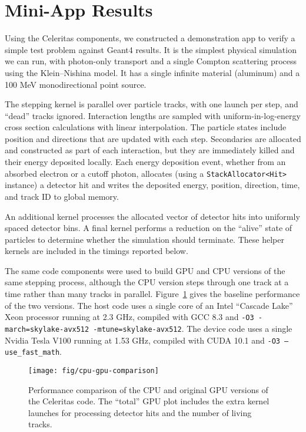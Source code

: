 \documentclass{webofc}
\begin{document}
\section{Mini-App Results}
\label{sec:miniapp}

Using the Celeritas components, we constructed a demonstration app to verify a
simple test problem against Geant4 \cite{geant4} results. It is the simplest physical
simulation we can run, with photon-only transport and a single
Compton scattering process using the Klein--Nishina model.  It has a single
infinite material (aluminum) and a 100 MeV monodirectional point source.

The stepping kernel is parallel over particle tracks, with one launch per step,
and ``dead'' tracks ignored. Interaction lengths are sampled with
uniform-in-log-energy cross section calculations with linear interpolation. The
particle states include position and directions that are updated with each step.
Secondaries are allocated and constructed as part of each interaction, but they
are immediately killed and their energy deposited locally. Each energy
deposition event, whether from an absorbed electron or a cutoff photon,
allocates (using a \texttt{StackAllocator<Hit>} instance) a detector hit and
writes the deposited energy, position, direction, time, and track ID to global
memory.

An additional kernel processes the allocated vector of detector hits into
uniformly spaced detector bins. A final kernel performs a reduction on the
``alive'' state of particles to determine whether the simulation should
terminate. These helper kernels are included in the timings reported below.

The same code components were used to build GPU and CPU versions of the same
stepping process, although the CPU version steps through one track at a time
rather than many tracks in parallel.  Figure~\ref{fig:baseline} gives the
baseline performance of the two versions. The host code uses a single core of an
Intel ``Cascade Lake'' Xeon processor running at 2.3 GHz, compiled with GCC 8.3
and \texttt{-O3 -march=skylake-avx512 -mtune=skylake-avx512}. The device code
uses a single Nvidia Tesla V100 running at 1.53 GHz, compiled with CUDA 10.1 and
\texttt{-O3 --use\_fast\_math}.

\begin{figure}[htb]
  \centering
  \texttt{[image: fig/cpu-gpu-comparison]}
  \caption{Performance comparison of the CPU and original GPU versions of the
  Celeritas code. The ``total'' GPU plot includes the extra kernel launches for
  processing detector hits and the number of living tracks.}
  \label{fig:baseline}
\end{figure}
\end{document}
